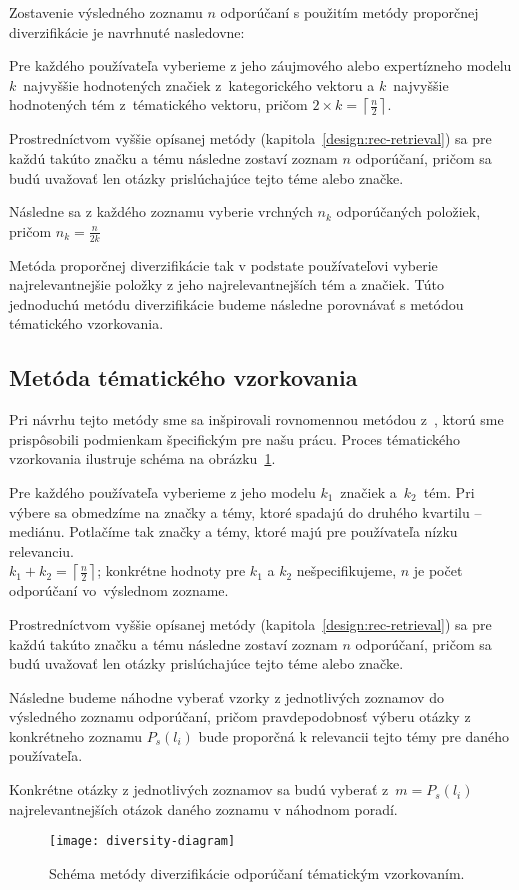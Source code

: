 Zostavenie výsledného zoznamu $n$ odporúčaní s použitím metódy proporčnej diverzifikácie je navrhnuté nasledovne:

\begin{my_enumerate}
\item{
    Pre každého používateľa vyberieme z jeho záujmového alebo expertízneho modelu $k$~najvyššie hodnotených značiek
    z~kategorického vektoru a $k$~najvyššie hodnotených tém z~tématického vektoru, pričom
    $2 \times k = \left\lceil\frac{n}{2}\right\rceil$.
}
\item{
    Prostredníctvom vyššie opísanej metódy (kapitola~\ref{design:rec-retrieval}) sa pre každú takúto značku a tému
    následne zostaví zoznam $n$ odporúčaní, pričom sa budú uvažovať len otázky prislúchajúce tejto téme alebo značke.
}
\item{
    Následne sa z každého zoznamu vyberie vrchných $n_k$ odporúčaných položiek, pričom $n_k = \frac{n}{2k}$
}
\end{my_enumerate}

Metóda proporčnej diverzifikácie tak v podstate používateľovi vyberie najrelevantnejšie položky z jeho najrelevantnejších
tém a značiek. Túto jednoduchú metódu diverzifikácie budeme následne porovnávať s metódou tématického vzorkovania.


\subsection{Metóda tématického vzorkovania}

Pri návrhu tejto metódy sme sa inšpirovali rovnomennou metódou z~\cite{Szpektor2013}, ktorú sme prispôsobili
podmienkam špecifickým pre našu prácu. Proces tématického vzorkovania ilustruje schéma na obrázku~\ref{fig:tematic-sampling}.

\begin{my_enumerate}
\item{
    Pre každého používateľa vyberieme z jeho modelu $k_1$~značiek a~$k_2$~tém. Pri výbere sa obmedzíme na značky a témy,
    ktoré spadajú do druhého kvartilu -- mediánu. Potlačíme tak značky a témy, ktoré majú pre používateľa nízku relevanciu.\\
    $k_1 + k_2 = \left\lceil\frac{n}{2}\right\rceil$; konkrétne hodnoty pre $k_1$ a $k_2$ nešpecifikujeme, $n$ je počet
    odporúčaní vo~výslednom zozname.
}
\item{
    Prostredníctvom vyššie opísanej metódy (kapitola~\ref{design:rec-retrieval}) sa pre každú takúto značku a tému
    následne zostaví zoznam $n$ odporúčaní, pričom sa budú uvažovať len otázky prislúchajúce tejto téme alebo značke.
}
\item{
    Následne budeme náhodne vyberať vzorky z jednotlivých zoznamov do výsledného zoznamu odporúčaní, pričom pravdepodobnosť
    výberu otázky z konkrétneho zoznamu $P_s(l_i)$ bude proporčná k relevancii tejto témy pre daného používateľa.
}
\item{
    Konkrétne otázky z jednotlivých zoznamov sa budú vyberať z~$m = P_s(l_i)$ najrelevantnejších otázok daného zoznamu
    v náhodnom poradí.

}
\end{my_enumerate}

\begin{figure}[H]\begin{center}
\texttt{[image: diversity-diagram]}
\caption{Schéma metódy diverzifikácie odporúčaní tématickým vzorkovaním.\label{fig:tematic-sampling}}\end{center}
\end{figure}
